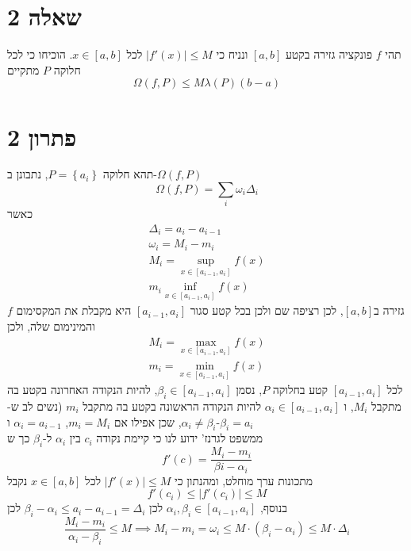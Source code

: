 \documentclass[12pt, titlepage]{article}
\begin{document}
\part*{שאלה 2}
תהי $f$ פונקציה גזירה בקטע $\left[ a,b \right]$ ונניח כי $\left| f'\left( x \right) \right|\leq M$ לכל $x \in \left[ a,b \right]$. הוכיחו כי לכל חלוקה $P$ מתקיים
$$
	\Omega \left( f,P \right) \leq M\lambda \left( P \right) \left( b-a \right)
$$
\part*{פתרון 2}
תהא חלוקה $P=\left\{ a_{i} \right\}$, נתבונן ב-$\Omega \left( f,P \right)$
$$
	\Omega \left( f,P \right) = \sum_{i}\omega_{i}\Delta_{i}
$$
כאשר
\begin{gather*}
	\Delta_{i}=  a_{i}-a_{i-1}  \\
	\omega_{i}=M_{i} -  m_{i} \\
	M_{i}=\underset{ x \in \left[ a_{i-1},a_{i} \right]  }{ \sup }f\left( x \right) \\
m_{i}	\underset{ x \in \left[a_{i-1}, a_{i} \right]  }{ \inf } f\left( x \right)
\end{gather*}
$f$ גזירה ב$\left[ a,b \right]$, לכן רציפה שם ולכן בכל קטע סגור $\left[ a_{i-1},a_{i} \right]$ היא מקבלת את המקסימום והמינימום שלה, ולכן
\begin{gather*}
	M_{i}= \underset{ x \in \left[ a_{i-1},a_{i} \right]  } { \max }f\left( x \right)  \\
	m_{i}= \underset{ x \in \left[ a_{i-1},a_{i} \right]  } { \min }f\left( x \right) 
\end{gather*}
לכל $\left[ a_{i-1},a_{i} \right]$ קטע בחלוקה $P$, נסמן $\beta_{i}\in \left[ a_{i-1},a_{i} \right]$, להיות הנקודה האחרונה בקטע בה מתקבל $M_{i}$, ו $\alpha_{i}\in \left[ a_{i-1},a_{i} \right]$  להיות הנקודה הראשונה בקטע בה מתקבל $m_{i}$ (נשים לב ש-$\alpha_{i}\neq\beta_{i}$, שכן אפילו אם $m_i=M_{i}$, $\alpha_{i}=a_{i-1}$ ו-$\beta_{i}=a_{i}$\\
ממשפט לגרנז' ידוע לנו כי קיימת נקודה $c_{i}$ בין $\alpha_{i}$ ל-$\beta_{i}$ כך ש
$$
	f'\left( c \right)  = \frac{M_{i}-m_{i}}{\beta{i}-\alpha_{i}}
$$
מתכונות ערך מוחלט, ומהנתון כי $\left| f'\left( x \right) \right|\leq M$ לכל $x \in \left[ a,b \right]$ נקבל
$$
f'\left( c_{i} \right)\leq \left| f'\left( c_{i} \right) \right| \leq M
$$
בנוסף, $\alpha_{i},\beta_{i}\in \left[ a_{i-1},a_{i} \right]$ לכן $\beta_{i}-\alpha_{i}\leq a_{i}-a_{i-1}=\Delta_{i}$ 
לכן
$$
	\frac{M_{i}-m_{i}}{\alpha_{i}-\beta_{i}}\leq M \implies M_{i}-m_{i}=\omega_{i}\leq M \cdot \left( \beta_{i}-\alpha_{i} \right) \leq M\cdot\Delta_{i}
$$
\end{document}

